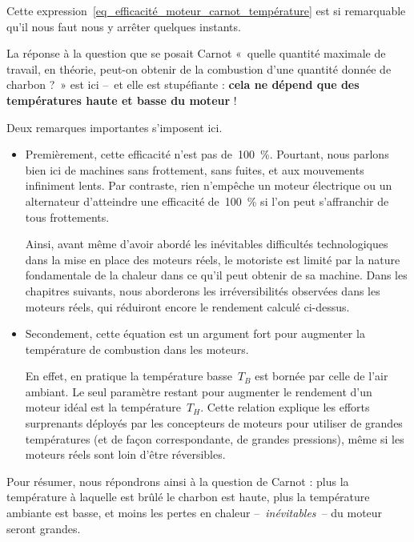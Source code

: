 		Cette expression~\ref{eq_efficacité_moteur_carnot_température} est si remarquable qu’il nous faut nous y arrêter quelques instants.

		La réponse à la question que se posait Carnot «~quelle quantité maximale de travail, en théorie, peut-on obtenir de la combustion d’une quantité donnée de charbon ?~» est ici --\ et elle est stupéfiante : \textbf{cela ne dépend que des températures haute et basse du moteur} !

		Deux remarques importantes s’imposent ici.

		\begin{itemize}
			\item Premièrement, cette efficacité n’est pas de~\SI{100}{\percent}. Pourtant, nous parlons bien ici de machines sans frottement, sans fuites, et aux mouvements infiniment lents. Par contraste, rien n’empêche un moteur électrique ou un alternateur d’atteindre une efficacité de~\SI{100}{\percent} si l’on peut s’affranchir de tous frottements.

			Ainsi, avant même d’avoir abordé les inévitables difficultés technologiques dans la mise en place des moteurs réels, le motoriste est limité par la nature fondamentale de la chaleur dans ce qu’il peut obtenir de sa machine. Dans les chapitres suivants, nous aborderons les irréversibilités observées dans les moteurs réels, qui réduiront encore le rendement calculé ci-dessus.

			\item Secondement, cette équation est un argument fort pour augmenter la température de combustion dans les moteurs.

			En effet, en pratique la température basse~$T_B$ est bornée par celle de l’air ambiant. Le seul paramètre restant pour augmenter le rendement d’un moteur idéal est la température~$T_H$. Cette relation explique les efforts surprenants déployés par les concepteurs de moteurs pour utiliser de grandes températures (et de façon correspondante, de grandes pressions), même si les moteurs réels sont loin d’être réversibles.

		\end{itemize}

		Pour résumer, nous répondrons ainsi à la question de Carnot : plus la température à laquelle est brûlé le charbon est haute, plus la température ambiante est basse, et moins les pertes en chaleur --\ \emph{inévitables}\ -- du moteur seront grandes.
		
